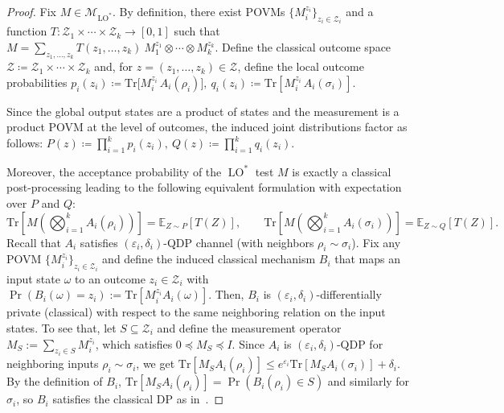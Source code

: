\documentclass[11pt]{article}
\def\Tr{\mathrm{Tr}}
\theoremstyle{plain}
\theoremstyle{remark}
\begin{document}
\begin{proof}
Fix $M\in\mathcal M_{\operatorname{LO}^*}$. By definition, there exist POVMs
$\{M_i^{z_i}\}_{z_i\in\mathcal Z_i}$ and a function $T:\mathcal Z_1\times\cdots\times\mathcal Z_k\to[0,1]$
such that
$
    M=\sum_{z_1,\ldots,z_k} T(z_1,\ldots,z_k) \ M_1^{z_1}\otimes\cdots\otimes M_k^{z_k}.
$
Define the classical outcome space $\mathcal{Z} \coloneqq \mathcal {Z}_1\times\cdots\times\mathcal {Z}_k$ and,
for $z=(z_1,\ldots,z_k)\in\mathcal Z$, define the local outcome probabilities $p_i(z_i)\coloneqq\Tr\!\big[M_i^{z_i}\,A_i(\rho_i)\big],
\
q_i(z_i)\coloneqq\Tr\!\left[M_i^{z_i}\,A_i(\sigma_i)\right].$

Since the global output states are a product of states and the measurement is a product POVM at the level of outcomes,
the induced joint distributions factor as follows: $  P(z)\coloneqq\prod_{i=1}^k p_i(z_i),
\ 
Q(z)\coloneqq\prod_{i=1}^k q_i(z_i).$

Moreover, the acceptance probability of the $\operatorname{LO}^*$ test $M$ is exactly a classical post-processing leading to the following equivalent formulation with expectation over $P$ and $Q$:
\begin{equation}\label{eq:accept-as-expectation_2}
\Tr\!\left[ M \left( \bigotimes_{i=1}^k A_i(\rho_i) \right) \right] = \mathbb{E}_{Z\sim P}[T(Z)],
\qquad
\Tr\!\left[ M \left( \bigotimes_{i=1}^k A_i(\sigma_i) \right) \right] = \mathbb{E}_{Z\sim Q}[T(Z)].
\end{equation} \label{eq:close_to_classical}
 Recall that $A_i$ satisfies $(\varepsilon_i,\delta_i)$-QDP channel (with neighbors $\rho_i \sim \sigma_i$). Fix any POVM $\{M_i^{z_i}\}_{z_i\in\mathcal{Z}_i}$ and define the induced
classical mechanism $B_i$ that maps an input state $\omega$ to an outcome $z_i\in\mathcal{Z}_i$ with
$\operatorname{Pr}(B_i(\omega)=z_i):=\Tr[M_i^{z_i}A_i(\omega)]$. Then,  $B_i$ is $(\varepsilon_i,\delta_i)$-differentially private (classical) with respect to the same
neighboring relation on the input states.
To see that, let $S\subseteq\mathcal Z_i$ and define the measurement operator $M_S:=\sum_{z_i\in S}M_i^{z_i}$, which satisfies
$0\preceq M_S\preceq I$. Since $A_i$ is $(\varepsilon_i,\delta_i)$-QDP for neighboring inputs $\rho_i\sim\sigma_i$, we get 
$
    \Tr[M_S A_i(\rho_i)]\le e^{\varepsilon_i}\Tr[M_S A_i(\sigma_i)]+\delta_i.
$
By the definition of $B_i$,
$\Tr[M_S A_i(\rho_i)]=\Pr(B_i(\rho_i)\in S)$ and similarly for $\sigma_i$, so $B_i$ satisfies 
the classical DP as in~.




\end{proof}
\end{document}
